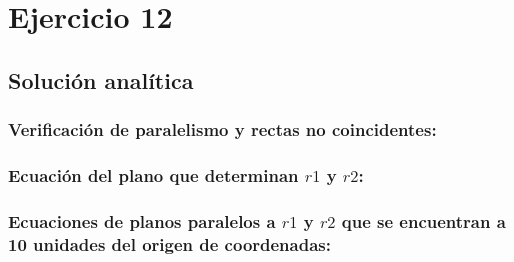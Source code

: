 \newpage
\clearpage

\section{Ejercicio 12}



\newpage
\subsection{Solución analítica}



\newpage
\subsubsection{Verificación de paralelismo y rectas no coincidentes:}


\newpage
\subsubsection{\texorpdfstring{Ecuación del plano que determinan $r1$ y $r2$:}{}}


\newpage
\subsubsection{\texorpdfstring{Ecuaciones de planos paralelos a $r1$ y $r2$ que se encuentran a 10 unidades del origen de coordenadas:}{}}


